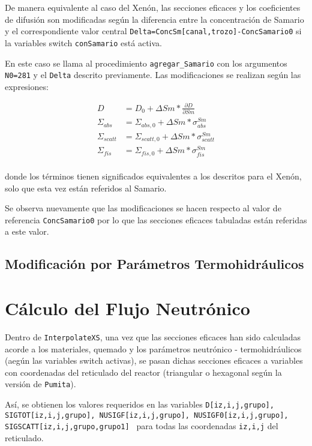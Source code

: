 De manera equivalente al caso del Xenón, las secciones eficaces y los coeficientes de difusión son modificadas según la diferencia entre la concentración de Samario y el correspondiente valor central \texttt{Delta=ConcSm[canal,trozo]-ConcSamario0} si la variables switch \texttt{conSamario} está activa. 

En este caso se llama al procedimiento \texttt{agregar\_Samario} con los argumentos \texttt{N0=281} y el \texttt{Delta} descrito previamente. Las modificaciones se realizan según las expresiones:

\begin{align*}
D &= D_0 + \Delta Sm * \frac{\partial D}{\partial Sm}\\	
\Sigma_{abs} &= \Sigma_{abs,0} + \Delta Sm * \sigma^{Sm}_{abs}\\	
\Sigma_{scatt} &= \Sigma_{scatt,0} + \Delta Sm * \sigma^{Sm}_{scatt}\\	
\Sigma_{fis} &= \Sigma_{fis,0} + \Delta Sm * \sigma^{Sm}_{fis}\\
\end{align*}

donde los términos tienen significados equivalentes a los descritos para el Xenón, solo que esta vez están referidos al Samario. 

Se observa nuevamente que las modificaciones se hacen respecto al valor de referencia \texttt{ConcSamario0} por lo que las secciones eficaces tabuladas están referidas a este valor. 




\subsection{Modificación por Parámetros Termohidráulicos}




\section{Cálculo del Flujo Neutrónico}

Dentro de \texttt{InterpolateXS}, una vez que las secciones eficaces han sido calculadas acorde a los materiales, quemado y los parámetros neutrónico - termohidráulicos (aegún las variables switch activas), se pasan dichas secciones eficaces a variables con coordenadas del reticulado del reactor (triangular o hexagonal según la versión de \texttt{Pumita}). 

Así, se obtienen los valores requeridos en las variables \texttt{D[iz,i,j,grupo], SIGTOT[iz,i,j,grupo], NUSIGF[iz,i,j,grupo], NUSIGF0[iz,i,j,grupo], SIGSCATT[iz,i,j,grupo,grupo1] } para todas las coordenadas \texttt{iz,i,j} del reticulado.

